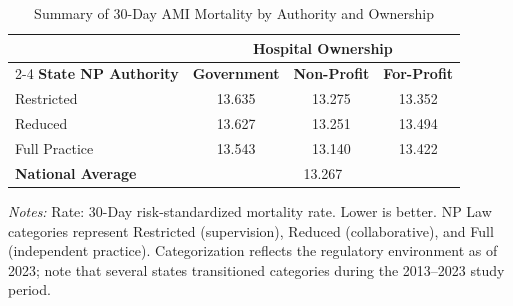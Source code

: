 \begin{table}[htbp]
    \centering
    \caption{Summary of 30-Day AMI Mortality by Authority and Ownership}
    \label{tab:mortality_rate_ami}
    \vspace{0.2cm}
    \begin{tabular}{lccc}
        \toprule
        & \multicolumn{3}{c}{\textbf{Hospital Ownership}} \\
        \cmidrule(lr){2-4}
        \textbf{State NP Authority} & \textbf{Government} & \textbf{Non-Profit} & \textbf{For-Profit} \\
        \midrule
        Restricted & 13.635 & 13.275 & 13.352 \\
        Reduced & 13.627 & 13.251 & 13.494 \\
        Full Practice & 13.543 & 13.140 & 13.422 \\
        \midrule
        \textbf{National Average} & \multicolumn{3}{c}{13.267} \\
        \bottomrule
    \end{tabular}
    \vspace{0.1cm}
    \begin{minipage}{0.85\textwidth}
        \footnotesize \textit{Notes:} Rate: 30-Day risk-standardized mortality rate. Lower is better. NP Law categories represent Restricted (supervision), Reduced (collaborative), and Full (independent practice). Categorization reflects the regulatory environment as of 2023; note that several states transitioned categories during the 2013--2023 study period.
    \end{minipage}
\end{table}